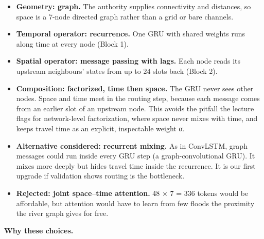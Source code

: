\documentclass[11pt]{article}
\providecommand{\tightlist}{}
\begin{document}
\begin{itemize}
\tightlist
\item
  \textbf{Geometry: graph.} The authority supplies connectivity and distances, so space is a 7-node directed graph rather than a grid or bare channels.
\item
  \textbf{Temporal operator: recurrence.} One GRU with shared weights runs along time at every node (Block 1).
\item
  \textbf{Spatial operator: message passing with lags.} Each node reads its upstream neighbours' states from up to 24 slots back (Block 2).
\item
  \textbf{Composition: factorized, time then space.} The GRU never sees other nodes. Space and time meet in the routing step, because each message comes from an earlier slot of an upstream node. This avoids the pitfall the lecture flags for network-level factorization, where space never mixes with time, and keeps travel time as an explicit, inspectable weight α.
\item
  \textbf{Alternative considered: recurrent mixing.} As in ConvLSTM, graph messages could run inside every GRU step (a graph-convolutional GRU). It mixes more deeply but hides travel time inside the recurrence. It is our first upgrade if validation shows routing is the bottleneck.
\item
  \textbf{Rejected: joint space--time attention.} 48 × 7 = 336 tokens would be affordable, but attention would have to learn from few floods the proximity the river graph gives for free.
\end{itemize}

\textbf{Why these choices.}
\end{document}
